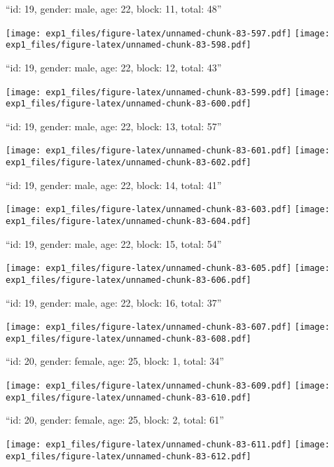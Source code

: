 \documentclass[11pt,,]{article}
\begin{document}
\newpage
[1] 

``id: 19, gender: male, age: 22, block: 11, total: 48''

\texttt{[image: exp1\_files/figure-latex/unnamed-chunk-83-597.pdf]}
\texttt{[image: exp1\_files/figure-latex/unnamed-chunk-83-598.pdf]}

\newpage
[1] 

``id: 19, gender: male, age: 22, block: 12, total: 43''

\texttt{[image: exp1\_files/figure-latex/unnamed-chunk-83-599.pdf]}
\texttt{[image: exp1\_files/figure-latex/unnamed-chunk-83-600.pdf]}

\newpage
[1] 

``id: 19, gender: male, age: 22, block: 13, total: 57''

\texttt{[image: exp1\_files/figure-latex/unnamed-chunk-83-601.pdf]}
\texttt{[image: exp1\_files/figure-latex/unnamed-chunk-83-602.pdf]}

\newpage
[1] 

``id: 19, gender: male, age: 22, block: 14, total: 41''

\texttt{[image: exp1\_files/figure-latex/unnamed-chunk-83-603.pdf]}
\texttt{[image: exp1\_files/figure-latex/unnamed-chunk-83-604.pdf]}

\newpage
[1] 

``id: 19, gender: male, age: 22, block: 15, total: 54''

\texttt{[image: exp1\_files/figure-latex/unnamed-chunk-83-605.pdf]}
\texttt{[image: exp1\_files/figure-latex/unnamed-chunk-83-606.pdf]}

\newpage
[1] 

``id: 19, gender: male, age: 22, block: 16, total: 37''

\texttt{[image: exp1\_files/figure-latex/unnamed-chunk-83-607.pdf]}
\texttt{[image: exp1\_files/figure-latex/unnamed-chunk-83-608.pdf]}

\newpage
[1] 

``id: 20, gender: female, age: 25, block: 1, total: 34''

\texttt{[image: exp1\_files/figure-latex/unnamed-chunk-83-609.pdf]}
\texttt{[image: exp1\_files/figure-latex/unnamed-chunk-83-610.pdf]}

\newpage
[1] 

``id: 20, gender: female, age: 25, block: 2, total: 61''

\texttt{[image: exp1\_files/figure-latex/unnamed-chunk-83-611.pdf]}
\texttt{[image: exp1\_files/figure-latex/unnamed-chunk-83-612.pdf]}
\end{document}
